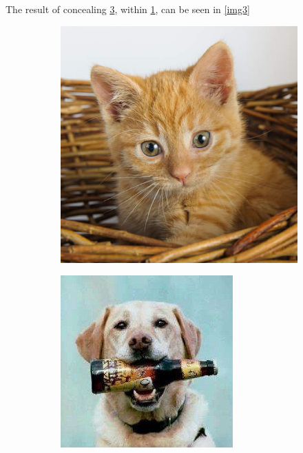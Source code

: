 The result of concealing \ref{img2}, within \ref{img1}, can be seen in \ref{img3}

\begin{figure}[]
	\centering
	\begin{subfigure}[b]{.3\linewidth}
		\includegraphics[width=\linewidth]{sections/pictures/vessel.jpg}
		\label{img1}
	\end{subfigure}
	\hspace{.02\linewidth}
	\begin{subfigure}[b]{.3\linewidth}
		\includegraphics[width=\linewidth]{sections/pictures/concealed.jpg}
		\label{img2}
	\end{subfigure}
	\hspace{.02\linewidth}


\end{figure}
